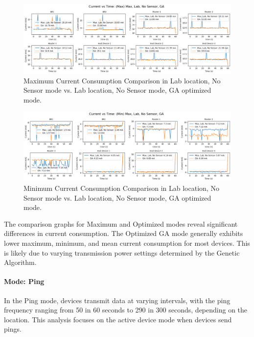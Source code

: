 \begin{figure}[H]
  \centering
  \includegraphics[width=1\textwidth]{images/research_results/current_consumption_analysis/optimized/lab/no_sensor/ga/comparison/max_comparison_lab_no-sensor_vs_lab_no-sensor_ga.png}
    \caption{Maximum Current Consumption Comparison in Lab location, No Sensor mode vs. Lab location, No Sensor mode, GA optimized mode.}
    \label{fig:max_comparison_lab_no-sensor_vs_lab_no-sensor_ga}
\end{figure}

\begin{figure}[H]
  \centering
  \includegraphics[width=1\textwidth]{images/research_results/current_consumption_analysis/optimized/lab/no_sensor/ga/comparison/min_comparison_lab_no-sensor_vs_lab_no-sensor_ga.png}
    \caption{Minimum Current Consumption Comparison in Lab location, No Sensor mode vs. Lab location, No Sensor mode, GA optimized mode.}
    \label{fig:min_comparison_lab_no-sensor_vs_lab_no-sensor_ga}
\end{figure}

The comparison graphs for Maximum and Optimized modes reveal significant differences in current consumption. The Optimized GA mode generally exhibits lower maximum, minimum, and mean current consumption for most devices. This is likely due to varying transmission power settings determined by the Genetic Algorithm.

\paragraph{Mode: Ping}
In the Ping mode, devices transmit data at varying intervals, with the ping frequency ranging from 50 in 60 seconds to 290 in 300 seconds, depending on the location. This analysis focuses on the active device mode when devices send pings.

